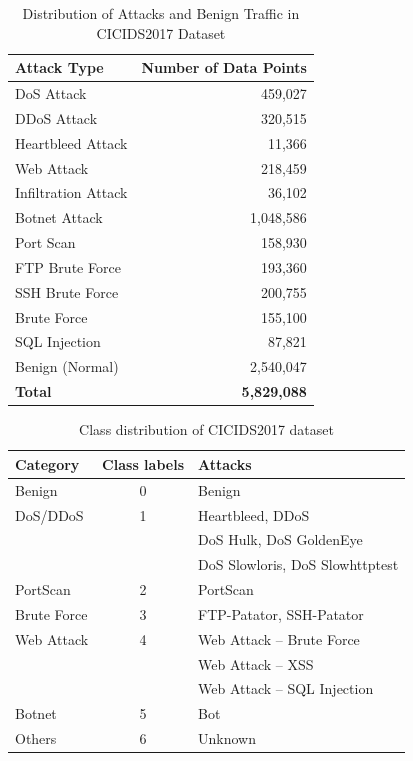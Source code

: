\begin{table}[htbp]
\centering
\begin{tabular}{|l|r|}
\hline
\textbf{Attack Type} & \textbf{Number of Data Points} \\ \hline
DoS Attack & 459,027 \\ 
DDoS Attack & 320,515 \\ 
Heartbleed Attack & 11,366 \\ 
Web Attack & 218,459 \\ 
Infiltration Attack & 36,102 \\ 
Botnet Attack & 1,048,586 \\ 
Port Scan & 158,930 \\ 
FTP Brute Force & 193,360 \\ 
SSH Brute Force & 200,755 \\ 
Brute Force & 155,100 \\ 
SQL Injection & 87,821 \\ 
Benign (Normal) & 2,540,047 \\ \hline
\textbf{Total} & \textbf{5,829,088} \\ \hline
\end{tabular}
\caption{Distribution of Attacks and Benign Traffic in CICIDS2017 Dataset}
\label{tab:attack_distribution}
\end{table}

\begin{table}[htbp]
\centering
\caption{Class distribution of CICIDS2017 dataset}
\begin{tabular}{lcl}
\toprule
\textbf{Category} & \textbf{Class labels} & \textbf{Attacks} \\
\midrule
Benign & 0 & Benign \\
\midrule
DoS/DDoS & 1 & Heartbleed, DDoS \\
         & & DoS Hulk, DoS GoldenEye \\
         & & DoS Slowloris, DoS Slowhttptest \\
\midrule
PortScan & 2 & PortScan \\
\midrule
Brute Force & 3 & FTP-Patator, SSH-Patator \\
\midrule
Web Attack & 4 & Web Attack -- Brute Force \\
           & & Web Attack -- XSS \\
           & &Web Attack -- SQL Injection \\
\midrule
Botnet & 5 & Bot \\
\midrule
Others & 6 & Unknown \\
\bottomrule
\end{tabular}
\end{table}

